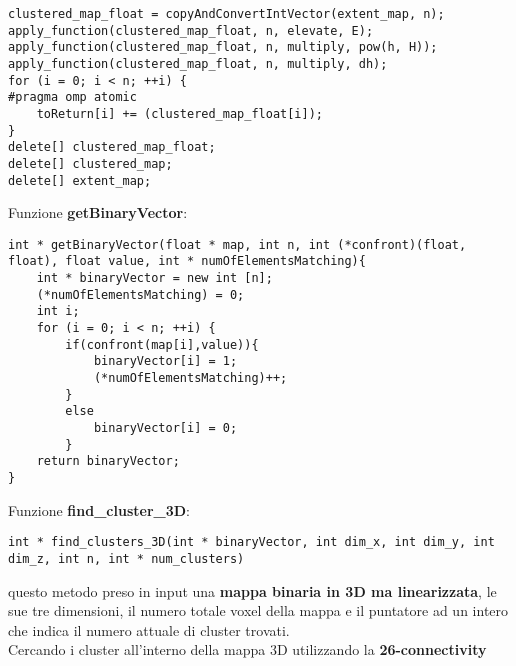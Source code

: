 \documentclass{beamer}
\begin{document}
\begin{frame}[fragile]
\begin{center}
\begin{lstlisting}
clustered_map_float = copyAndConvertIntVector(extent_map, n);
apply_function(clustered_map_float, n, elevate, E);
apply_function(clustered_map_float, n, multiply, pow(h, H));
apply_function(clustered_map_float, n, multiply, dh);
for (i = 0; i < n; ++i) {
#pragma omp atomic
    toReturn[i] += (clustered_map_float[i]);
}
delete[] clustered_map_float;
delete[] clustered_map;
delete[] extent_map;
\end{lstlisting}
\end{center}
\end{frame}

\begin{frame}[fragile]
Funzione \textbf{getBinaryVector}:
\begin{center}
\begin{lstlisting}
int * getBinaryVector(float * map, int n, int (*confront)(float, float), float value, int * numOfElementsMatching){
    int * binaryVector = new int [n];
    (*numOfElementsMatching) = 0;
    int i;
    for (i = 0; i < n; ++i) {
        if(confront(map[i],value)){
            binaryVector[i] = 1;
            (*numOfElementsMatching)++;
        }
        else
            binaryVector[i] = 0;
        }
    return binaryVector;
}
\end{lstlisting}
\end{center}
\end{frame}

\begin{frame}[fragile]
Funzione \textbf{find\_cluster\_3D}:\\
\begin{lstlisting}
int * find_clusters_3D(int * binaryVector, int dim_x, int dim_y, int dim_z, int n, int * num_clusters)
\end{lstlisting}
questo metodo preso in input una \textbf{mappa binaria in 3D ma linearizzata}, le sue tre dimensioni, il numero totale voxel della mappa e il puntatore ad un intero che indica il numero attuale di cluster trovati.\\
\smallskip
Cercando i cluster all'interno della mappa 3D utilizzando la \textbf{26-connectivity}
\end{frame}
\end{document}
